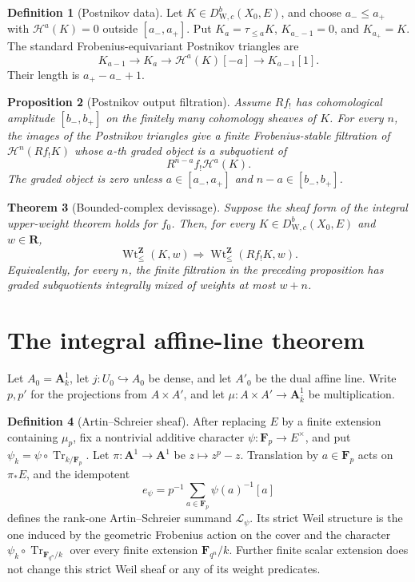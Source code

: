 \documentclass[10pt]{article}
\newtheorem{theorem}{Theorem}[section]
\newtheorem{proposition}[theorem]{Proposition}
\theoremstyle{definition}
\newtheorem{definition}[theorem]{Definition}
\newcommand{\WeilD}{D^b_{\mathrm W,c}}
\newcommand{\IntWtLe}{\operatorname{Wt}^{\mathbf Z}_{\leq}}
\begin{document}
\begin{definition}[Postnikov data]
Let \(K\in\WeilD(X_0,E)\), and choose \(a_-\le a_+\) with
\(\mathcal H^a(K)=0\) outside \([a_-,a_+]\).  Put
\(K_a=\tau_{\le a}K\), \(K_{a_--1}=0\), and \(K_{a_+}=K\).  The standard
Frobenius-equivariant Postnikov triangles are
\[
 K_{a-1}\longrightarrow K_a\longrightarrow
 \mathcal H^a(K)[-a]\longrightarrow K_{a-1}[1].
\]
Their length is \(a_+-a_-+1\).
\end{definition}

\begin{proposition}[Postnikov output filtration]
Assume \(Rf_!\) has cohomological amplitude \([b_-,b_+]\) on the finitely
many cohomology sheaves of \(K\).  For every \(n\), the images of the
Postnikov triangles give a finite Frobenius-stable filtration of
\(\mathcal H^n(Rf_!K)\) whose \(a\)-th graded object is a subquotient of
\[
                       R^{n-a}f_!\mathcal H^a(K).
\]
The graded object is zero unless \(a\in[a_-,a_+]\) and
\(n-a\in[b_-,b_+]\).
\end{proposition}

\begin{theorem}[Bounded-complex devissage]
Suppose the sheaf form of the integral upper-weight theorem holds for
\(f_0\).  Then, for every \(K\in\WeilD(X_0,E)\) and \(w\in\mathbf R\),
\[
               \IntWtLe(K,w)\Longrightarrow
               \IntWtLe(Rf_!K,w).
\]
Equivalently, for every \(n\), the finite filtration in the preceding
proposition has graded subquotients integrally mixed of weights at most
\(w+n\).
\end{theorem}

\section{The integral affine-line theorem}

Let \(A_0=\mathbf A^1_k\), let \(j:U_0\hookrightarrow A_0\) be dense, and
let \(A'_0\) be the dual affine line.  Write \(p,p'\) for the projections
from \(A\times A'\), and let
\(\mu:A\times A'\to\mathbf A^1_{\bar k}\) be multiplication.

\begin{definition}[Artin--Schreier sheaf]
After replacing \(E\) by a finite extension containing \(\mu_p\), fix a
nontrivial additive character
\(\psi:\mathbf F_p\to E^\times\), and put
\(\psi_k=\psi\circ\operatorname{Tr}_{k/\mathbf F_p}\).  Let
\(\pi:\mathbf A^1\to\mathbf A^1\) be \(z\mapsto z^p-z\).  Translation by
\(a\in\mathbf F_p\) acts on \(\pi_*E\), and the idempotent
\[
 e_\psi=p^{-1}\sum_{a\in\mathbf F_p}\psi(a)^{-1}[a]
\]
defines the rank-one Artin--Schreier summand \(\mathcal L_\psi\).  Its
strict Weil structure is the one induced by the geometric Frobenius action
 on the cover and the character
\(\psi_k\circ\operatorname{Tr}_{\mathbf F_{q^n}/k}\) over every finite
extension \(\mathbf F_{q^n}/k\).  Further finite scalar extension does not
change this strict Weil sheaf or any of its weight predicates.
\end{definition}
\end{document}
